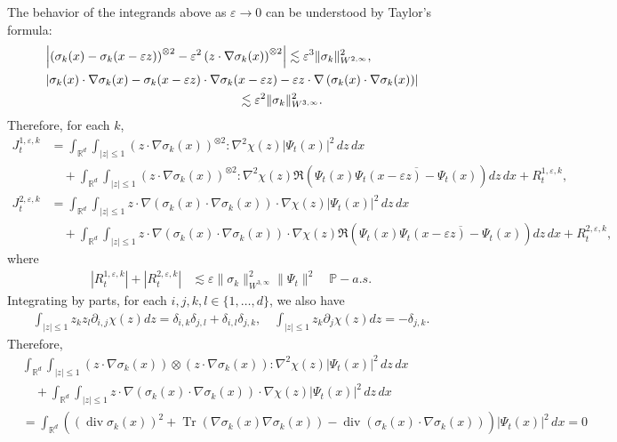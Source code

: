 \documentclass[a4paper,10pt]{amsart}
\newcommand{\R}{\mathbb{R}}
\DeclareMathOperator{\trace}{Tr}
\renewcommand{\epsilon}{\varepsilon}
\theoremstyle{remark}
\numberwithin{equation}{section}
\begin{document}
The behavior of the integrands above as $\epsilon\rightarrow 0$ can be
understood by Taylor's formula:
\begin{align*}
    &\left\lvert
    \left(\sigma_k(x)-\sigma_k(x-\epsilon z)\right)^{\otimes2}
    -\epsilon^2\left(z\cdot\nabla \sigma_k(x)\right)^{\otimes2}
    \right\rvert
    \lesssim \epsilon^3 \|\sigma_k\|_{W^{2,\infty}}^2,\\
    &\left\lvert
    \sigma_k(x)\cdot\nabla\sigma_k(x)
    -\sigma_k(x-\epsilon z)\cdot\nabla\sigma_k(x-\epsilon z)
    -\epsilon z\cdot\nabla\left(\sigma_k(x)\cdot\nabla\sigma_k(x)\right)
    \right\rvert\\
    &\hspace{55mm}\lesssim
    \epsilon^2 \|\sigma_k\|_{W^{3,\infty}}^2.
\end{align*}
Therefore, for each $k$,
\begin{align*}
    J^{1,\epsilon,k}_t
    &=\int_{\R^d}\int_{|z|\leq 1}
    \left(z\cdot\nabla \sigma_k(x)\right)^{\otimes2}
    :\nabla^2\chi(z)|\Psi_t(x)|^2\,dz\,dx\\
    &\quad+\int_{\R^d}\int_{|z|\leq 1}
    \left(z\cdot\nabla \sigma_k(x)\right)^{\otimes2}
    :\nabla^2\chi(z)
    \Re\left(\Psi_t(x)
    \overline{\Psi_t(x-\epsilon z)-\Psi_t(x)}\right)dz\,dx
    +R^{1,\epsilon,k}_t,\\
    J^{2,\epsilon,k}_t
    &=\int_{\R^d}\int_{|z|\leq 1}
    z\cdot\nabla\left(\sigma_k(x)\cdot\nabla\sigma_k(x)\right)
    \cdot\nabla\chi(z)|\Psi_t(x)|^2\,dz\,dx\\
    &\quad+\int_{\R^d}\int_{|z|\leq 1}
    z\cdot\nabla\left(\sigma_k(x)\cdot\nabla\sigma_k(x)\right)
    \cdot\nabla\chi(z)
    \Re\left(\Psi_t(x)
    \overline{\Psi_t(x-\epsilon z)-\Psi_t(x)}\right)dz\,dx
    +R^{2,\epsilon,k}_t,
\end{align*}
where
\begin{align*}
    |R^{1,\epsilon,k}_t|+|R^{2,\epsilon,k}_t|
    &\lesssim \epsilon \|\sigma_k\|_{W^{3,\infty}}^2
    \|\Psi_t\|^2 \quad \mathbb{P}-a.s.
\end{align*}
Integrating by parts, for each $i,j,k,l\in \{1,\dots, d\}$, we also have 
\begin{align*}
    \int_{|z|\leq 1} z_k  z_l\partial_{i,j}\chi(z) dz =\delta_{i,k}\delta_{j,l}+\delta_{i,l}\delta_{j,k},\quad
    \int_{|z|\leq 1} z_k\partial_j \chi(z)dz =-\delta_{j,k}.
\end{align*}
Therefore,
\begin{align*}
     &\int_{\R^d}\int_{|z|\leq 1}
     \left(z\cdot\nabla \sigma_k(x)\right)\otimes
     \left(z\cdot\nabla \sigma_k(x) \right):\nabla^2\chi(z)
     |\Psi_t(x)|^2\,dz\,dx\\
     &\quad+\int_{\R^d}\int_{|z|\leq 1}
     z\cdot\nabla\left(\sigma_k(x)\cdot\nabla\sigma_k(x)\right)
     \cdot\nabla\chi(z)|\Psi_t(x)|^2\,dz\,dx\\
     &=\int_{\R^d}\left(
     \left(\operatorname{div}\sigma_k(x)\right)^2
     +\trace(\nabla\sigma_k(x)\nabla\sigma_k(x))
     -\operatorname{div}\left(\sigma_k(x)\cdot\nabla\sigma_k(x)\right)
     \right)|\Psi_t(x)|^2\,dx=0
\end{align*}
\end{document}
